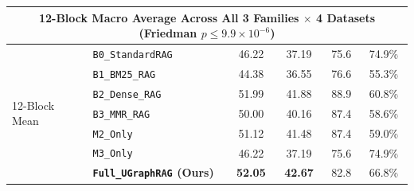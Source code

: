 \documentclass[11pt]{article}
\begin{document}
\begin{table}[t]
{{\begin{tabular}{llcccc}
\midrule
\multicolumn{6}{c}{\textbf{12-Block Macro Average Across All 3 Families $\times$ 4 Datasets (Friedman $p \le 9.9\times 10^{-6}$)}} \\
\midrule
\multirow{7}{*}{12-Block Mean} & \texttt{B0\_StandardRAG} & 46.22 & 37.19 & 75.6 & 74.9\% \\
 & \texttt{B1\_BM25\_RAG} & 44.38 & 36.55 & 76.6 & 55.3\% \\
 & \texttt{B2\_Dense\_RAG} & 51.99 & 41.88 & 88.9 & 60.8\% \\
 & \texttt{B3\_MMR\_RAG} & 50.00 & 40.16 & 87.4 & 58.6\% \\
 & \texttt{M2\_Only} & 51.12 & 41.48 & 87.4 & 59.0\% \\
 & \texttt{M3\_Only} & 46.22 & 37.19 & 75.6 & 74.9\% \\
& \textbf{\texttt{Full\_UGraphRAG} (Ours)} & \textbf{52.05} & \textbf{42.67} & 82.8 & 66.8\% \\
\bottomrule
\end{tabular}
}}
\end{table}
\end{document}
